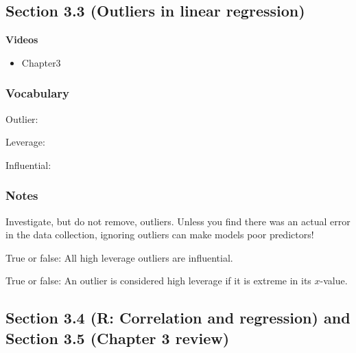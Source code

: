 \documentclass[
]{report}
\providecommand{\tightlist}{%
  \setlength{\itemsep}{0pt}\setlength{\parskip}{0pt}}
\newcommand{\rgs}{\vspace{12pt}} %
\begin{document}
\hypertarget{section-3.3-outliers-in-linear-regression}{%
\subsection*{Section 3.3 (Outliers in linear regression)}\label{section-3.3-outliers-in-linear-regression}}


\textbf{Videos}

\begin{itemize}
\tightlist
\item
  Chapter3
\end{itemize}


\hypertarget{vocabulary-8}{%
\subsubsection*{Vocabulary}\label{vocabulary-8}}

Outlier:
\rgs

Leverage:
\rgs

Influential:
\rgs

\hypertarget{notes-10}{%
\subsubsection*{Notes}\label{notes-10}}

Investigate, but do not remove, outliers. Unless you find there was an actual error in the data collection, ignoring outliers can make models poor predictors!

True or false: All high leverage outliers are influential.

True or false: An outlier is considered high leverage if it is extreme in its \(x\)-value.

\hypertarget{section-3.4-r-correlation-and-regression-and-section-3.5-chapter-3-review}{%
\subsection*{Section 3.4 (R: Correlation and regression) and Section 3.5 (Chapter 3 review)}\label{section-3.4-r-correlation-and-regression-and-section-3.5-chapter-3-review}}
\end{document}
